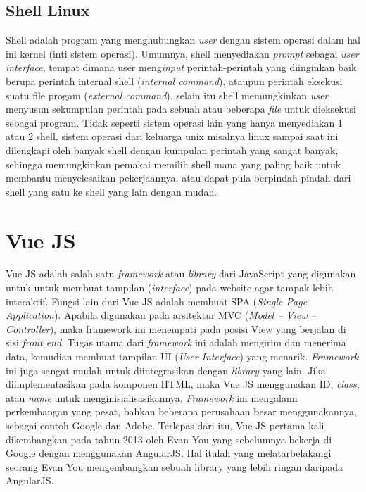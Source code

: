 {{\subsection{Shell Linux}

Shell adalah program yang menghubungkan \textit{user} dengan sistem operasi dalam hal ini kernel (inti sistem operasi).
Umumnya, shell menyediakan \textit{prompt} sebagai \textit{user interface}, tempat dimana user meng\textit{input} perintah-perintah yang diinginkan baik berupa perintah internal shell (\textit{internal command}),
ataupun perintah eksekusi suatu file progam (\textit{external command}), selain itu shell memungkinkan \textit{user} menyusun sekumpulan perintah pada sebuah atau beberapa \textit{file} untuk dieksekusi sebagai program.
Tidak seperti sistem operasi lain yang hanya menyediakan 1 atau 2 shell, sistem operasi dari keluarga unix misalnya linux sampai saat ini dilengkapi oleh banyak shell dengan kumpulan perintah yang sangat banyak, sehingga memungkinkan pemakai memilih shell mana yang paling baik untuk membantu menyelesaikan pekerjaannya, atau dapat pula berpindah-pindah dari shell yang satu ke shell yang lain dengan mudah.

\section{Vue JS}
Vue JS adalah salah satu \textit{framework} atau \textit{library} dari JavaScript yang digunakan untuk untuk membuat tampilan (\textit{interface}) pada website agar tampak lebih interaktif.
Fungsi lain dari Vue JS adalah membuat SPA (\textit{Single Page Application}). Apabila digunakan pada arsitektur MVC (\textit{Model – View – Controller}), maka framework ini menempati pada posisi View yang berjalan di sisi \textit{front end}.
Tugas utama dari \textit{framework} ini adalah mengirim dan menerima data, kemudian membuat tampilan UI (\textit{User Interface}) yang menarik. \textit{Framework} ini juga sangat mudah untuk diintegrasikan dengan \textit{library} yang lain.
Jika diimplementasikan pada komponen HTML, maka Vue JS menggunakan ID, \textit{class}, atau \textit{name} untuk menginisialisasikannya.
\textit{Framework} ini mengalami perkembangan yang pesat, bahkan beberapa perusahaan besar menggunakannya, sebagai contoh Google dan Adobe. Terlepas dari itu, Vue JS pertama kali dikembangkan pada tahun 2013 oleh Evan You yang sebelumnya bekerja di Google dengan menggunakan AngularJS.
Hal itulah yang melatarbelakangi seorang Evan You mengembangkan sebuah library yang lebih ringan daripada AngularJS.

}}
